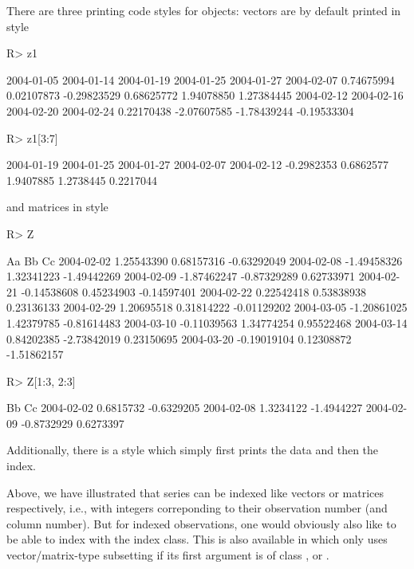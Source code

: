 \documentclass{Z}
\begin{document}
There are three printing code styles for  objects: vectors are by default
printed in  style
\begin{Schunk}
\begin{Sinput}
R> z1
\end{Sinput}
\begin{Soutput}
 2004-01-05  2004-01-14  2004-01-19  2004-01-25  2004-01-27  2004-02-07 
 0.74675994  0.02107873 -0.29823529  0.68625772  1.94078850  1.27384445 
 2004-02-12  2004-02-16  2004-02-20  2004-02-24 
 0.22170438 -2.07607585 -1.78439244 -0.19533304 
\end{Soutput}
\begin{Sinput}
R> z1[3:7]
\end{Sinput}
\begin{Soutput}
2004-01-19 2004-01-25 2004-01-27 2004-02-07 2004-02-12 
-0.2982353  0.6862577  1.9407885  1.2738445  0.2217044 
\end{Soutput}
\end{Schunk}
and matrices in  style
\begin{Schunk}
\begin{Sinput}
R> Z
\end{Sinput}
\begin{Soutput}
           Aa          Bb          Cc         
2004-02-02  1.25543390  0.68157316 -0.63292049
2004-02-08 -1.49458326  1.32341223 -1.49442269
2004-02-09 -1.87462247 -0.87329289  0.62733971
2004-02-21 -0.14538608  0.45234903 -0.14597401
2004-02-22  0.22542418  0.53838938  0.23136133
2004-02-29  1.20695518  0.31814222 -0.01129202
2004-03-05 -1.20861025  1.42379785 -0.81614483
2004-03-10 -0.11039563  1.34774254  0.95522468
2004-03-14  0.84202385 -2.73842019  0.23150695
2004-03-20 -0.19019104  0.12308872 -1.51862157
\end{Soutput}
\begin{Sinput}
R> Z[1:3, 2:3]
\end{Sinput}
\begin{Soutput}
           Bb         Cc        
2004-02-02  0.6815732 -0.6329205
2004-02-08  1.3234122 -1.4944227
2004-02-09 -0.8732929  0.6273397
\end{Soutput}
\end{Schunk}
Additionally, there is a  style which simply first prints the data 
and then the index.

Above, we have illustrated that  series can be indexed like vectors
or matrices respectively, i.e., with integers correponding to their observation
number (and column number). But for indexed observations, one would obviously also
like to be able to index with the index class. This is also available in \code{[}
which only uses vector/matrix-type subsetting if its first argument is of class
,  or .
\end{document}
